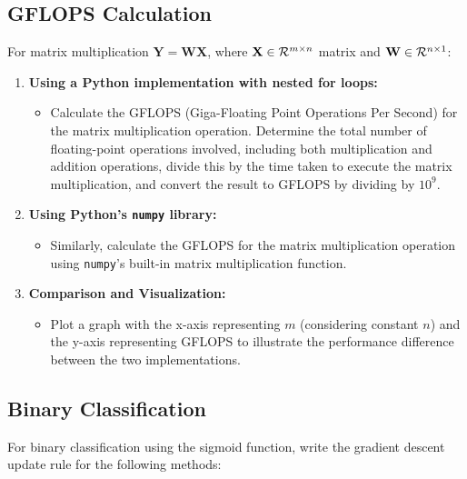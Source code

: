 \subsection{GFLOPS Calculation}



For matrix multiplication \( \mathbf{Y} = \mathbf{WX} \), where \( \mathbf{X} \in \mathcal{R}^{m \times n}\)  matrix and \( \mathbf{W} \in \mathcal{R}^{n \times 1}\):

\begin{enumerate}
    \item \textbf{Using a Python implementation with nested for loops:}
    \begin{itemize}
        \item Calculate the GFLOPS (Giga-Floating Point Operations Per Second) for the matrix multiplication operation. Determine the total number of floating-point operations involved, including both multiplication and addition operations, divide this by the time taken to execute the matrix multiplication, and convert the result to GFLOPS by dividing by \( 10^9 \).
    \end{itemize}

    \item \textbf{Using Python’s \texttt{numpy} library:}
    \begin{itemize}
        \item Similarly, calculate the GFLOPS for the matrix multiplication operation using \texttt{numpy}'s built-in matrix multiplication function.
    \end{itemize}

    \item \textbf{Comparison and Visualization:}
    \begin{itemize}
        \item Plot a graph with the x-axis representing \(m\) (considering constant \(n\)) and the y-axis representing GFLOPS to illustrate the performance difference between the two implementations.
    \end{itemize}
\end{enumerate}



\subsection{Binary Classification}


For binary classification using the sigmoid function, write the gradient descent update rule for the following methods:

